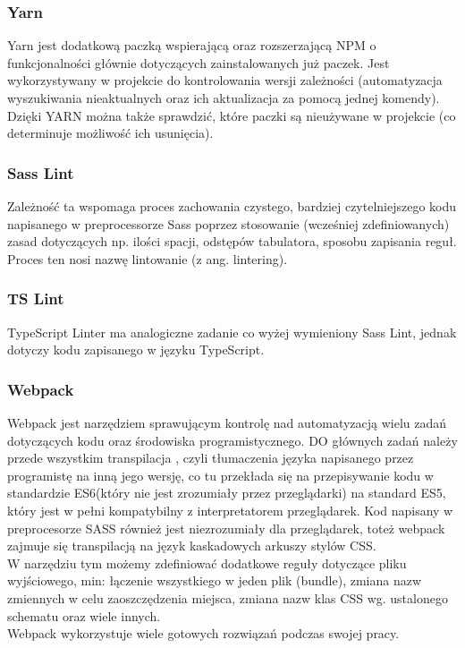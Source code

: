 \documentclass[eng,printmode]{mgr}
\begin{document}
\subsubsection{Yarn}
Yarn \cite {Yarn} jest dodatkową paczką wspierającą oraz rozszerzającą NPM o funkcjonalności głównie dotyczących  zainstalowanych już paczek. Jest wykorzystywany w projekcie do kontrolowania wersji zależności (automatyzacja wyszukiwania nieaktualnych oraz ich aktualizacja za pomocą jednej komendy). Dzięki YARN można także sprawdzić, które paczki są nieużywane w projekcie (co determinuje możliwość ich usunięcia).

\subsubsection{Sass Lint}
Zależność ta \cite {SassLint} wspomaga proces zachowania czystego, bardziej czytelniejszego kodu napisanego w preprocessorze  Sass poprzez stosowanie (wcześniej zdefiniowanych) zasad dotyczących np. ilości spacji, odstępów tabulatora, sposobu zapisania reguł. Proces ten nosi nazwę lintowanie (z ang. lintering).

\subsubsection{TS Lint}
TypeScript Linter \cite {TSLint} ma analogiczne zadanie co wyżej wymieniony Sass Lint, jednak dotyczy kodu zapisanego w języku TypeScript.

\subsubsection{Webpack}
Webpack \cite {Webpack} jest narzędziem sprawującym kontrolę nad automatyzacją wielu zadań dotyczących kodu oraz środowiska programistycznego. DO głównych zadań należy przede wszystkim transpilacja \cite {Keyword_Transpile}, czyli tłumaczenia języka napisanego przez programistę na inną jego wersję, co tu przekłada się na przepisywanie kodu w standardzie ES6(który nie jest zrozumiały przez przeglądarki) na standard ES5, który jest w pełni kompatybilny z interpretatorem przeglądarek. Kod napisany w preprocesorze SASS również jest niezrozumiały dla przeglądarek, toteż webpack zajmuje się transpilacją na język kaskadowych arkuszy stylów CSS.
\\
W narzędziu tym możemy zdefiniować dodatkowe reguły dotyczące pliku wyjściowego, min: łączenie wszystkiego w jeden plik (bundle), zmiana nazw zmiennych w celu zaoszczędzenia miejsca, zmiana nazw klas CSS wg. ustalonego schematu oraz wiele innych. 
\\
Webpack wykorzystuje wiele gotowych rozwiązań podczas swojej pracy.
\end{document}
